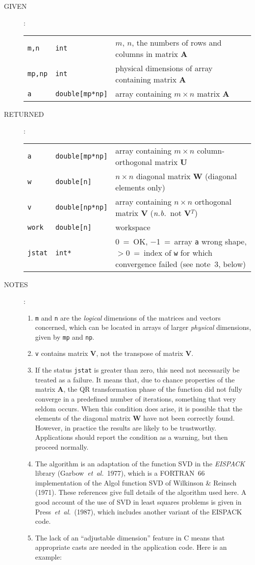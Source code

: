 \documentclass[11pt,fleqn,twoside]{article}
\renewcommand{\_}{{\tt\char'137}}     %
\newlength{\oldspacing}
\newcommand{\args}[2]
{
  \goodbreak
  \setlength{\oldspacing}{\topsep}
  \setlength{\topsep}{0.3ex}
  \begin{description}
  \item[#1]:\\[1.5ex]
    \begin{tabular}{p{6.7em}p{6.8em}p{22em}}
      #2
    \end{tabular}
  \end{description}
  \setlength{\topsep}{\oldspacing}
}
\newcommand{\spec}[3]
{
  {\tt \mbox{#1}} & {\tt \mbox{#2}} & {#3}
}
\newcommand{\notes}[1]
{
  \goodbreak
  \setlength{\oldspacing}{\topsep}
  \setlength{\topsep}{0.3ex}
  \begin{description}
    \item[NOTES]:
        #1
  \end{description}
  \setlength{\topsep}{\oldspacing}
}
\begin{document}
\args{GIVEN}
{
 \spec{m,n}{int}{$m$, $n$, the numbers of
                 rows and columns in matrix {\bf A}} \\
 \spec{mp,np}{int}{physical dimensions of array
                   containing matrix {\bf A}} \\
 \spec{a}{double[mp*np]}{array containing $m \times n$ matrix {\bf A}}
}
\args{RETURNED}
{
 \spec{a}{double[mp*np]}{array containing $m \times n$ column-orthogonal
                         matrix {\bf U}} \\
 \spec{w}{double[n]}{$n \times n$ diagonal matrix {\bf W}
                     (diagonal elements only)} \\
 \spec{v}{double[np*np]}{array containing $n \times n$ orthogonal
                         matrix {\bf V} ({\it n.b.}\ not
                         {\bf V}$^{T}$)} \\
 \spec{work}{double[n]}{workspace} \\
 \spec{jstat}{int*}{0~=~OK, $-$1~=~array {\tt a} wrong shape,
                    $>$0~=~index of {\tt w}
                    for which convergence failed (see note~3, below)}
}
\notes
{
 \begin{enumerate}
  \item {\tt m} and {\tt n}
        are the {\it logical}\/ dimensions of the
        matrices and vectors concerned, which can be located in
        arrays of larger {\it physical}\/ dimensions,
        given by {\tt mp} and {\tt np}.
  \item {\tt v} contains matrix {\bf V},
        not the transpose of matrix {\bf V}.
  \item If the status {\tt jstat} is greater than zero, this need not
        necessarily be treated as a failure.  It means that, due to
        chance properties of the matrix {\bf A}, the QR transformation
        phase of the function did not fully converge in a predefined
        number of iterations, something that very seldom occurs.
        When this condition does arise, it is possible that the
        elements of the diagonal matrix
        {\bf W} have not been correctly
        found.  However, in practice the results are likely to
        be trustworthy.  Applications should report the condition
        as a warning, but then proceed normally.
  \item The algorithm is an adaptation of the
        function SVD in the {\it EISPACK}\,
        library (Garbow~{\it et~al.}\ 1977),
        which is a FORTRAN~66 implementation of the Algol
        function SVD of Wilkinson \& Reinsch (1971).
        These
        references give full details of the algorithm used here.
        A good account of the use of SVD
        in least squares problems is given
        in Press~{\it et~al.}\ (1987), which includes another
        variant of the EISPACK code.
  \item The lack of an ``adjustable dimension'' feature in C means that
        appropriate casts are needed in the application code.  Here is
        an example:
 \end{enumerate}
}
\end{document}
